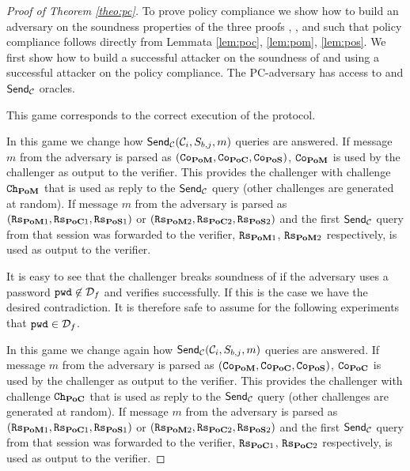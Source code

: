 
\begin{proof}[Proof of Theorem \ref{theo:pc}]
To prove policy compliance we show how to build an adversary on the soundness properties of the three proofs \PoC, \PoM, and \PoS such that policy compliance follows directly from Lemmata \ref{lem:poc}, \ref{lem:pom}, \ref{lem:pos}.
We first show how to build a successful attacker on the soundness of \PoC and \PoM using a successful attacker on the policy compliance.
The PC-adversary has access to \Setup and $\mathsf{Send}_\mathcal{C}$ oracles.

 This game corresponds to the correct execution of the protocol.

 In this game we change how $\mathsf{Send}_\mathcal{C}(\mathcal{C}_i, S_{b,j}, m)$ queries are answered.
If message $m$ from the adversary is parsed as $(\mathtt{Co}_\mathsf{\bf PoM},\mathtt{Co}_\mathsf{\bf PoC},\mathtt{Co}_\mathsf{\bf PoS})$, $\mathtt{Co}_\mathsf{\bf PoM}$ is used by the challenger as output to the \PoM verifier.
This provides the challenger with challenge $\mathtt{Ch}_\mathsf{\bf PoM}$ that is used as reply to the $\mathsf{Send}_\mathcal{C}$ query (other challenges are generated at random).
If message $m$ from the adversary is parsed as $(\mathtt{Rs}_{\mathsf{\bf PoM}1},\mathtt{Rs}_{\mathsf{\bf PoC}1},\mathtt{Rs}_{\mathsf{\bf PoS}1})$ or $(\mathtt{Rs}_{\mathsf{\bf PoM}2},\mathtt{Rs}_{\mathsf{\bf PoC}2},\mathtt{Rs}_{\mathsf{\bf PoS}2})$ and the first $\mathsf{Send}_\mathcal{C}$ query from that session was forwarded to the verifier, $\mathtt{Rs}_{\mathsf{\bf PoM}1}$, $\mathtt{Rs}_{\mathsf{\bf PoM}2}$ respectively, is used as output to the \PoM verifier.

It is easy to see that the challenger breaks soundness of \PoM if the adversary uses a password $\mathtt{pwd}\not\in\mathcal{D}_f$ and \PoM verifies successfully.
If this is the case we have the desired contradiction.
It is therefore safe to assume for the following experiments that $\mathtt{pwd}\in\mathcal{D}_f$.

In this game we change again how $\mathsf{Send}_\mathcal{C}(\mathcal{C}_i, S_{b,j}, m)$ queries are answered.
If message $m$ from the adversary is parsed as $(\mathtt{Co}_\mathsf{\bf PoM},\mathtt{Co}_\mathsf{\bf PoC},\mathtt{Co}_\mathsf{\bf PoS})$, $\mathtt{Co}_\mathsf{\bf PoC}$ is used by the challenger as output to the \PoC verifier.
This provides the challenger with challenge $\mathtt{Ch}_\mathsf{\bf PoC}$ that is used as reply to the $\mathsf{Send}_\mathcal{C}$ query (other challenges are generated at random).
If message $m$ from the adversary is parsed as $(\mathtt{Rs}_{\mathsf{\bf PoM}1},\mathtt{Rs}_{\mathsf{\bf PoC}1},\mathtt{Rs}_{\mathsf{\bf PoS}1})$ or $(\mathtt{Rs}_{\mathsf{\bf PoM}2},\mathtt{Rs}_{\mathsf{\bf PoC}2},\mathtt{Rs}_{\mathsf{\bf PoS}2})$ and the first $\mathsf{Send}_\mathcal{C}$ query from that session was forwarded to the verifier, $\mathtt{Rs}_{\mathsf{\bf PoC}1}$, $\mathtt{Rs}_{\mathsf{\bf PoC}2}$ respectively, is used as output to the \PoC verifier.


\end{proof}
